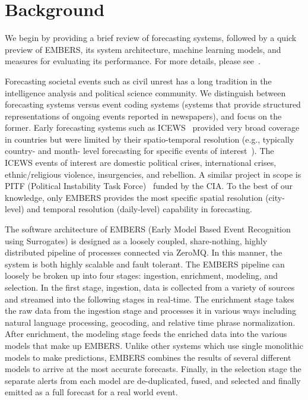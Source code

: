 \section{Background}
\label{sec:background}
We begin by providing a brief review of forecasting systems, followed by a
quick preview of EMBERS, its system architecture, machine learning models,
and measures for evaluating its performance. For more details, please
see~\cite{kdd:beating-the-news}.

Forecasting societal events such as civil unrest has a long tradition in the intelligence analysis and political science
community. We distinguish between forecasting systems versus event coding
systems (systems that provide
structured representations of ongoing events reported in newspapers), and focus on the former.
Early forecasting systems such as ICEWS~\cite{icews} provided very broad coverage in countries but
were limited by their spatio-temporal resolution (e.g., typically country- and month- level forecasting for
specific events of interest~\cite{eoiprediction}). The ICEWS events of interest are
domestic political crises, international crises, ethnic/religious violence, insurgencies,
and rebellion.
A similar project in scope is PITF (Political Instability
Task Force)~\cite{pitf} funded by the CIA.
To the best of our knowledge, only EMBERS provides
the most specific spatial resolution (city-level) and temporal resolution (daily-level) capability in forecasting.

The software architecture of EMBERS (Early Model Based Event Recognition using
Surrogates) is designed as a loosely coupled, share-nothing, highly distributed pipeline of
processes connected via ZeroMQ.  In this manner, the system is both highly scalable and fault
tolerant.  The EMBERS pipeline can loosely be broken up into four stages:
ingestion, enrichment, modeling, and selection.  In the first stage, ingestion,
data is collected from a variety of sources and streamed into the following
stages in real-time.  The enrichment stage takes the raw data from the ingestion stage
and processes it in various ways including natural language processing,
geocoding, and relative time phrase normalization.  After enrichment, the
modeling stage feeds the enriched data into the various models that make up
EMBERS.  Unlike other systems which use single monolithic models to make
predictions, EMBERS combines the results of several different models to arrive
at the most accurate forecasts.  Finally, in the selection stage the separate
alerts from each model are de-duplicated, fused, and selected and finally
emitted as a full forecast for a real world event.

